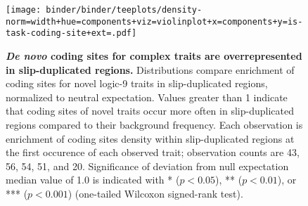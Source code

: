 \begin{figure}
\texttt{[image: binder/binder/teeplots/density-norm=width+hue=components+viz=violinplot+x=components+y=is-task-coding-site+ext=.pdf]}
\caption{%
  \textbf{\textit{De novo} coding sites for complex traits are overrepresented in slip-duplicated regions.}
  \footnotesize
  Distributions compare enrichment of coding sites for novel logic-9 traits in slip-duplicated regions, normalized to neutral expectation.
  Values greater than 1 indicate that coding sites of novel traits occur more often in slip-duplicated regions compared to their background frequency.
  Each observation is enrichment of coding sites density within slip-duplicated regions at the first occurence of each observed trait; observation counts are 43, 56, 54, 51, and 20.
  Significance of deviation from null expectation median value of 1.0 is indicated with * ($p < 0.05$), ** ($p < 0.01$), or *** ($p < 0.001$) (one-tailed Wilcoxon signed-rank test).
} \label{fig:potentiation}
\end{figure}
